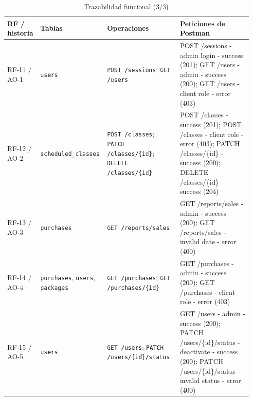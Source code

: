 \begin{table}[!t]\caption{Trazabilidad funcional (3/3)}\label{tab:traza-laura-3}\centering\scriptsize\setlength{\tabcolsep}{4pt}
\begin{tabular}{p{}p{}p{}p{}}\toprule
RF / historia & Tablas & Operaciones & Peticiones de Postman \\ \midrule
RF-11 / AO-1 & \texttt{users} & \texttt{POST /\allowbreak{}sessions}; \texttt{GET /\allowbreak{}users} & POST /\allowbreak{}sessions - admin login - success (201); GET /\allowbreak{}users - admin - success (200); GET /\allowbreak{}users - client role - error (403) \\
RF-12 / AO-2 & \texttt{scheduled\_\allowbreak{}classes} & \texttt{POST /\allowbreak{}classes}; \texttt{PATCH /\allowbreak{}classes/\allowbreak{}\{id\}}; \texttt{DELETE /\allowbreak{}classes/\allowbreak{}\{id\}} & POST /\allowbreak{}classes - success (201); POST /\allowbreak{}classes - client role - error (403); PATCH /\allowbreak{}classes/\allowbreak{}\{id\} - success (200); DELETE /\allowbreak{}classes/\allowbreak{}\{id\} - success (204) \\
RF-13 / AO-3 & \texttt{purchases} & \texttt{GET /\allowbreak{}reports/\allowbreak{}sales} & GET /\allowbreak{}reports/\allowbreak{}sales - admin - success (200); GET /\allowbreak{}reports/\allowbreak{}sales - invalid date - error (400) \\
RF-14 / AO-4 & \texttt{purchases}, \texttt{users}, \texttt{packages} & \texttt{GET /\allowbreak{}purchases}; \texttt{GET /\allowbreak{}purchases/\allowbreak{}\{id\}} & GET /\allowbreak{}purchases - admin - success (200); GET /\allowbreak{}purchases - client role - error (403) \\
RF-15 / AO-5 & \texttt{users} & \texttt{GET /\allowbreak{}users}; \texttt{PATCH /\allowbreak{}users/\allowbreak{}\{id\}/\allowbreak{}status} & GET /\allowbreak{}users - admin - success (200); PATCH /\allowbreak{}users/\allowbreak{}\{id\}/\allowbreak{}status - deactivate - success (200); PATCH /\allowbreak{}users/\allowbreak{}\{id\}/\allowbreak{}status - invalid status - error (400) \\
\bottomrule\end{tabular}\end{table}
